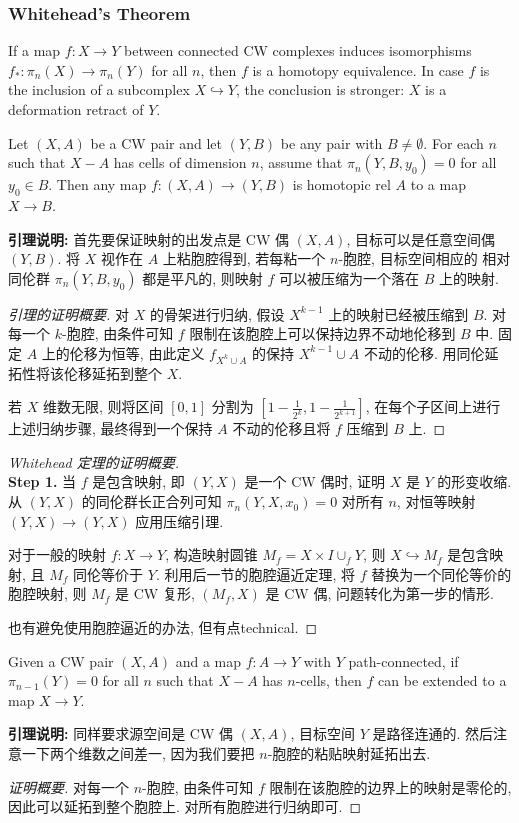 \subsubsection{Whitehead's Theorem}
\begin{theorem}
    If a map $f:X\to Y$ between connected CW complexes induces isomorphisms $f_*:\pi_n(X)\to \pi_n(Y)$ for all $n$, then $f$ is a homotopy equivalence. 
    In case $f$ is the inclusion of a subcomplex $X\hookrightarrow Y$, the conclusion is stronger: $X$ is a deformation retract of $Y$.
\end{theorem}
\begin{lemma}
    Let $(X,A)$ be a CW pair and let $(Y,B)$ be any pair with $B\neq\emptyset$. 
    For each $n$ such that $X-A$ has cells of dimension $n$, assume that $\pi_n(Y,B,y_0)=0$ for all $y_0\in B$. 
    Then any map $f:(X,A)\to (Y,B)$ is homotopic rel $A$ to a map $X\to B$.
\end{lemma}
\textbf{引理说明:} 首先要保证映射的出发点是 CW 偶 $(X,A)$, 目标可以是任意空间偶 $(Y,B)$. 将 $X$ 视作在 $A$ 上粘胞腔得到, 若每粘一个 $n$-胞腔, 目标空间相应的
相对同伦群 $\pi_n(Y,B,y_0)$ 都是平凡的, 则映射 $f$ 可以被压缩为一个落在 $B$ 上的映射.
\begin{proof}[引理的证明概要]
    对 $X$ 的骨架进行归纳, 假设 $X^{k-1}$ 上的映射已经被压缩到 $B$. 对每一个 $k$-胞腔, 由条件可知 $f$ 限制在该胞腔上可以保持边界不动地伦移到 $B$ 中. 
    固定 $A$ 上的伦移为恒等, 由此定义 $f_{X^k\cup A}$ 的保持 $X^{k-1}\cup A$ 不动的伦移. 用同伦延拓性将该伦移延拓到整个 $X$. 

    若 $X$ 维数无限, 则将区间 $[0,1]$ 分割为 $[1-\frac{1}{2^k},1-\frac{1}{2^{k+1}}]$, 
    在每个子区间上进行上述归纳步骤, 最终得到一个保持 $A$ 不动的伦移且将 $f$ 压缩到 $B$ 上.
\end{proof}
\begin{proof}[Whitehead 定理的证明概要]\hfill\\ 
    \noindent\textbf{Step 1.} 当 $f$ 是包含映射, 即 $(Y,X)$ 是一个 CW 偶时, 证明 $X$ 是 $Y$ 的形变收缩. 
    从 $(Y,X)$ 的同伦群长正合列可知 $\pi_n(Y,X,x_0)=0$ 对所有 $n$, 对恒等映射 $(Y,X)\to (Y,X)$ 应用压缩引理.

    对于一般的映射 $f:X\to Y$, 构造映射圆锥 $M_f=X\times I\cup_f Y$, 则 $X\hookrightarrow M_f$ 是包含映射, 且 $M_f$ 同伦等价于 $Y$.
    利用后一节的胞腔逼近定理, 将 $f$ 替换为一个同伦等价的胞腔映射, 则 $M_f$ 是 CW 复形, $(M_f,X)$ 是 CW 偶, 问题转化为第一步的情形.

    也有避免使用胞腔逼近的办法, 但有点technical.
\end{proof}
\begin{lemma}
    Given a CW pair $(X,A)$ and a map $f:A\to Y$ with $Y$ path-connected, if $\pi_{n-1}(Y)=0$ for all $n$ such that $X-A$ has $n$-cells, 
    then $f$ can be extended to a map $X\to Y$.
\end{lemma}
\textbf{引理说明:} 同样要求源空间是 CW 偶 $(X,A)$, 目标空间 $Y$ 是路径连通的. 然后注意一下两个维数之间差一, 因为我们要把 $n$-胞腔的粘贴映射延拓出去.
\begin{proof}[证明概要]
    对每一个 $n$-胞腔, 由条件可知 $f$ 限制在该胞腔的边界上的映射是零伦的, 因此可以延拓到整个胞腔上. 对所有胞腔进行归纳即可.
\end{proof}
